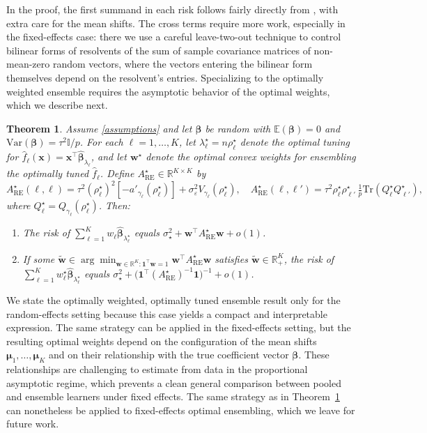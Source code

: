 \documentclass{article}
\theoremstyle{plain}
\newtheorem{theorem}{Theorem}[section]
\theoremstyle{remark}
\def \bbeta{\boldsymbol{\beta}}
\def \bx{\mathbf{x}}
\def \bbeta{\boldsymbol{\beta}}
\def \tr {\mathrm{Tr}}
\def \I{\mathcal{I}}
\def \E{\mathbb{E}}
\def \bmu{\pmb{\mu}}
\def \I {\mathbb{I}}
\begin{document}
In the proof, the first summand in each risk follows fairly directly from \cite{hastie2019surprises}, with extra care for the mean shifts. The cross terms require more work, especially in the fixed-effects case: there we use a careful leave-two-out technique to control bilinear forms of resolvents of the sum of sample covariance matrices of non-mean-zero random vectors, where the vectors entering the bilinear form themselves depend on the resolvent's entries. Specializing to the optimally weighted ensemble requires the asymptotic behavior of the optimal weights, which we describe next.

\begin{theorem}\label{thm:ensemble_optimal}
Assume \ref{assumptions} and let $\bbeta$ be random with $\E(\bbeta)=0$ and $\mathrm{Var}(\bbeta)=\tau^2\I/p$. For each $\ell=1,\ldots,K$, let $\lambda_\ell^\star=n\rho_\ell^\star$ denote the optimal tuning for $\hat{f}_\ell(\bx)=\bx^\top\hat{\bbeta}_{\lambda_\ell}$, and let $\mathbf{w}^\star$ denote the optimal convex weights for ensembling the optimally tuned $\hat{f}_\ell$. Define $A^\star_{\mathrm{RE}}\in\mathbb{R}^{K\times K}$ by
\[
A^\star_{\mathrm{RE}}(\ell,\ell)
=\tau^2(\rho_\ell^\star)^2[-a'_{\gamma_\ell}(\rho_\ell^\star)]
+\sigma_\varepsilon^2 V_{\gamma_\ell}(\rho_\ell^\star),
\quad
A^\star_{\mathrm{RE}}(\ell,\ell')
=\tau^2\rho_\ell^\star\rho_{\ell'}^\star\,
 \tfrac{1}{p}\tr(Q_\ell^\star Q_{\ell'}^\star),
\]
where $Q_\ell^\star=Q_{\gamma_\ell}(\rho_\ell^\star)$. Then:
\begin{enumerate}
\item The risk of $\sum_{\ell=1}^K w_\ell\hat{\bbeta}_{\lambda_\ell^\star}$ equals $\sigma_\star^2+\mathbf{w}^\top A^\star_{\mathrm{RE}}\mathbf{w}+o(1)$.

\item If some $\widetilde{\mathbf{w}}\in\arg\min_{\mathbf{w}\in\mathbb{R}^K: \mathbf{1}^\top\mathbf{w}=1}\mathbf{w}^\top A^\star_{\mathrm{RE}}\mathbf{w}$ satisfies $\widetilde{\mathbf{w}}\in\mathbb{R}_+^K$, the risk of $\sum_{\ell=1}^K w_\ell^\star\hat{\bbeta}_{\lambda_\ell^\star}$ equals $\sigma_\star^2+\bigl(\mathbf{1}^\top(A^\star_{\mathrm{RE}})^{-1}\mathbf{1}\bigr)^{-1}+o(1)$.
\end{enumerate}
\end{theorem}

We state the optimally weighted, optimally tuned ensemble result only for the random-effects setting because this case yields a compact and interpretable expression. The same strategy can be applied in the fixed-effects setting, but the resulting optimal weights depend on the configuration of the mean shifts $\bmu_1,\ldots,\bmu_K$ and on their relationship with the true coefficient vector $\bbeta$. These relationships are challenging to estimate from data in the proportional asymptotic regime, which prevents a clean general comparison between pooled and ensemble learners under fixed effects. The same strategy as in Theorem~\ref{thm:ensemble_optimal} can nonetheless be applied to fixed-effects optimal ensembling, which we leave for future work.
\end{document}
